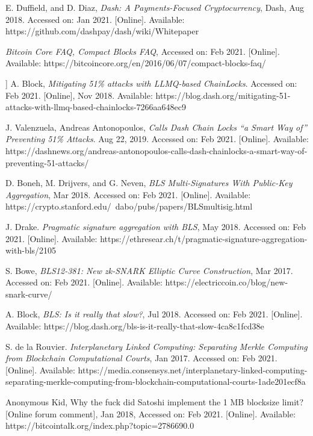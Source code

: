 \documentclass[peerreview]{ieeesyscoin}
\begin{document}
\begin{thebibliography}{00}
 E. Duffield, and D. Diaz, \textit{Dash: A Payments-Focused Cryptocurrency}, Dash, Aug 2018. Accessed on: Jan 2021. [Online]. Available: https://github.com/dashpay/dash/wiki/Whitepaper


 \textit{Bitcoin Core FAQ, Compact Blocks FAQ}, Accessed on: Feb 2021. [Online]. Available: https://bitcoincore.org/en/2016/06/07/compact-blocks-faq/

 ] A. Block, \textit{Mitigating 51\% attacks with LLMQ-based ChainLocks}. Accessed on: Feb 2021. [Online], Nov 2018. Available: https://blog.dash.org/mitigating-51-attacks-with-llmq-based-chainlocks-7266aa648ec9

 J. Valenzuela, Andreas Antonopoulos, \textit{Calls Dash Chain Locks “a Smart Way of” Preventing 51\% Attacks}. Aug 22, 2019. Accessed on: Feb 2021. [Online]. Available: https://dashnews.org/andreas-antonopoulos-calls-dash-chainlocks-a-smart-way-of-preventing-51-attacks/

 D. Boneh, M. Drijvers, and G. Neven, \textit{BLS Multi-Signatures With Public-Key Aggregation}, Mar 2018. Accessed on: Feb 2021. [Online]. Available: https://crypto.stanford.edu/~dabo/pubs/papers/BLSmultisig.html

 J. Drake. \textit{Pragmatic signature aggregation with BLS}, May 2018. Accessed on: Feb 2021. [Online]. Available:  https://ethresear.ch/t/pragmatic-signature-aggregation-with-bls/2105

 S. Bowe, \textit{BLS12-381: New zk-SNARK Elliptic Curve Construction}, Mar 2017. Accessed on: Feb 2021. [Online]. Available: https://electriccoin.co/blog/new-snark-curve/

  A. Block, \textit{BLS: Is it really that slow?}, Jul 2018. Accessed on: Feb 2021. [Online]. Available: https://blog.dash.org/bls-is-it-really-that-slow-4ca8c1fcd38e

  S. de la Rouvier. \textit{Interplanetary Linked Computing: Separating Merkle Computing from Blockchain Computational Courts}, Jan 2017. Accessed on: Feb 2021. [Online]. Available: https://media.consensys.net/interplanetary-linked-computing-separating-merkle-computing-from-blockchain-computational-courts-1ade201ecf8a

 Anonymous Kid, Why the fuck did Satoshi implement the 1 MB blocksize limit? [Online forum comment], Jan 2018, Accessed on: Feb 2021. [Online]. Available:  https://bitcointalk.org/index.php?topic=2786690.0


\end{thebibliography}
\end{document}
